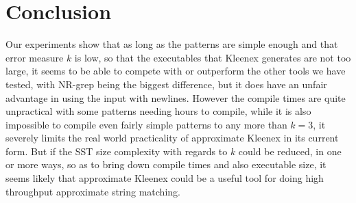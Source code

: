 \section{Conclusion}
Our experiments show that as long as the patterns are simple enough and that
error measure $k$ is low, so that the executables that Kleenex generates are
not too large, it seems to be able to compete with or outperform the other
tools we have tested, with NR-grep being the biggest difference, but it does
have an unfair advantage in using the input with newlines. However the compile
times are quite unpractical with some patterns needing hours to compile, while
it is also impossible to compile even fairly simple patterns to any more than
$k = 3$, it severely limits the real world practicality of approximate Kleenex
in its current form. But if the SST size complexity with regards to $k$ could
be reduced, in one or more ways, so as to bring down compile times and also
executable size, it seems likely that approximate Kleenex could be a useful
tool for doing high throughput approximate string matching.

